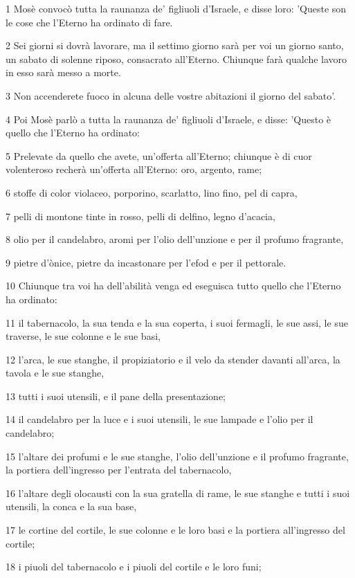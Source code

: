 \par 1 Mosè convocò tutta la raunanza de' figliuoli d'Israele, e disse loro: 'Queste son le cose che l'Eterno ha ordinato di fare.
\par 2 Sei giorni si dovrà lavorare, ma il settimo giorno sarà per voi un giorno santo, un sabato di solenne riposo, consacrato all'Eterno. Chiunque farà qualche lavoro in esso sarà messo a morte.
\par 3 Non accenderete fuoco in alcuna delle vostre abitazioni il giorno del sabato'.
\par 4 Poi Mosè parlò a tutta la raunanza de' figliuoli d'Israele, e disse: 'Questo è quello che l'Eterno ha ordinato:
\par 5 Prelevate da quello che avete, un'offerta all'Eterno; chiunque è di cuor volenteroso recherà un'offerta all'Eterno: oro, argento, rame;
\par 6 stoffe di color violaceo, porporino, scarlatto, lino fino, pel di capra,
\par 7 pelli di montone tinte in rosso, pelli di delfino, legno d'acacia,
\par 8 olio per il candelabro, aromi per l'olio dell'unzione e per il profumo fragrante,
\par 9 pietre d'ònice, pietre da incastonare per l'efod e per il pettorale.
\par 10 Chiunque tra voi ha dell'abilità venga ed eseguisca tutto quello che l'Eterno ha ordinato:
\par 11 il tabernacolo, la sua tenda e la sua coperta, i suoi fermagli, le sue assi, le sue traverse, le sue colonne e le sue basi,
\par 12 l'arca, le sue stanghe, il propiziatorio e il velo da stender davanti all'arca, la tavola e le sue stanghe,
\par 13 tutti i suoi utensili, e il pane della presentazione;
\par 14 il candelabro per la luce e i suoi utensili, le sue lampade e l'olio per il candelabro;
\par 15 l'altare dei profumi e le sue stanghe, l'olio dell'unzione e il profumo fragrante, la portiera dell'ingresso per l'entrata del tabernacolo,
\par 16 l'altare degli olocausti con la sua gratella di rame, le sue stanghe e tutti i suoi utensili, la conca e la sua base,
\par 17 le cortine del cortile, le sue colonne e le loro basi e la portiera all'ingresso del cortile;
\par 18 i piuoli del tabernacolo e i piuoli del cortile e le loro funi;
